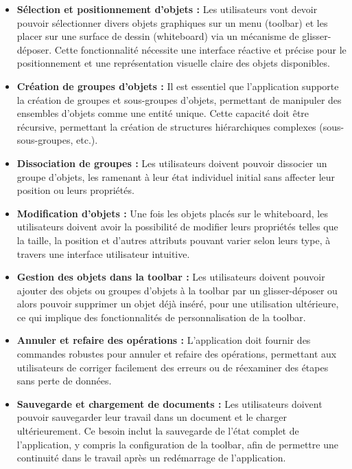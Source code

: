 \documentclass[a4paper,11pt]{article}
\begin{document}
\begin{itemize}
    \item \textbf{Sélection et positionnement d'objets :} Les utilisateurs vont devoir pouvoir sélectionner divers objets graphiques sur un menu (toolbar) et les placer sur une surface de dessin (whiteboard) via un mécanisme de glisser-déposer. Cette fonctionnalité nécessite une interface réactive et précise pour le positionnement et une représentation visuelle claire des objets disponibles.

    \item \textbf{Création de groupes d'objets :} Il est essentiel que l'application supporte la création de groupes et sous-groupes d'objets, permettant de manipuler des ensembles d'objets comme une entité unique. Cette capacité doit être récursive, permettant la création de structures hiérarchiques complexes (sous-sous-groupes, etc.).

    \item \textbf{Dissociation de groupes :} Les utilisateurs doivent pouvoir dissocier un groupe d'objets, les ramenant à leur état individuel initial sans affecter leur position ou leurs propriétés.

    \item \textbf{Modification d'objets :} Une fois les objets placés sur le whiteboard, les utilisateurs doivent avoir la possibilité de modifier leurs propriétés telles que la taille, la position et d'autres attributs pouvant varier selon leurs type, à travers une interface utilisateur intuitive.

    \item \textbf{Gestion des objets dans la toolbar :} Les utilisateurs doivent pouvoir ajouter des objets ou groupes d'objets à la toolbar par un glisser-déposer ou alors pouvoir supprimer un objet déjà inséré, pour une utilisation ultérieure, ce qui implique des fonctionnalités de personnalisation de la toolbar.

    \item \textbf{Annuler et refaire des opérations :} L'application doit fournir des commandes robustes pour annuler et refaire des opérations, permettant aux utilisateurs de corriger facilement des erreurs ou de réexaminer des étapes sans perte de données.

    \item \textbf{Sauvegarde et chargement de documents :} Les utilisateurs doivent pouvoir sauvegarder leur travail dans un document et le charger ultérieurement. Ce besoin inclut la sauvegarde de l'état complet de l'application, y compris la configuration de la toolbar, afin de permettre une continuité dans le travail après un redémarrage de l'application.

\end{itemize}
\end{document}
